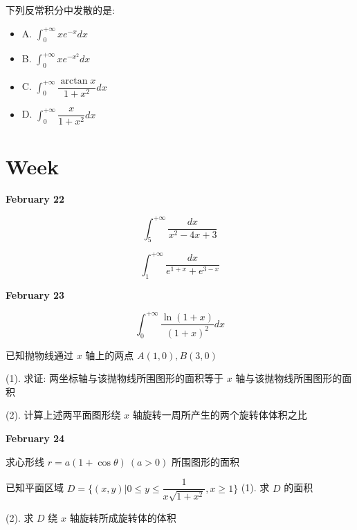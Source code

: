 \begin{example}[][Exam: 28.3.13]
	下列反常积分中发散的是:
\begin{itemize}
	\item A. $\int_{0}^{+\infty}xe^{-x}dx$
	\item B. $\int_{0}^{+\infty}xe^{-x^{2}}dx$
	\item C. $\int_{0}^{+\infty}\dfrac{\arctan x}{1+x^{2}}dx$
	\item D. $\int_{0}^{+\infty}\dfrac{x}{1+x^{2}}dx$
\end{itemize}
\end{example}

\section{Week }
\textcolor{purplea}{\textbf{February 22}}

\begin{example}[][Exam: 28.4.1]
	$$\int_{5}^{+\infty}\dfrac{dx}{x^{2}-4x+3}$$
\end{example}

\begin{example}[][Exam: 28.4.2]
	$$\int_{1}^{+\infty}\dfrac{dx}{e^{1+x}+e^{3-x}}$$
\end{example}

\textcolor{purplea}{\textbf{February 23}}

\begin{example}[][Exam: 28.4.3]
	$$\int_{0}^{+\infty}\dfrac{\ln(1+x)}{(1+x)^{2}}dx$$
\end{example}

\begin{example}[][Exam: 28.4.4]
	已知抛物线通过 $x$ 轴上的两点 $A(1,0),B(3,0)$

(1). 求证: 两坐标轴与该抛物线所围图形的面积等于 $x$ 轴与该抛物线所围图形的面积

(2). 计算上述两平面图形绕 $x$ 轴旋转一周所产生的两个旋转体体积之比
\end{example}

\textcolor{purplea}{\textbf{February 24}}

\begin{example}[][Exam: 28.4.5]
	求心形线 $r=a(1+\cos\theta)\ (a>0)$ 所围图形的面积
\end{example}

\begin{example}[][Exam: 28.4.6]
	已知平面区域 $D=\{(x,y)|0\leq y\leq \dfrac{1}{x\sqrt{1+x^{2}}},x\geq 1\}$
(1). 求 $D$ 的面积

(2). 求 $D$ 绕 $x$ 轴旋转所成旋转体的体积
\end{example}

